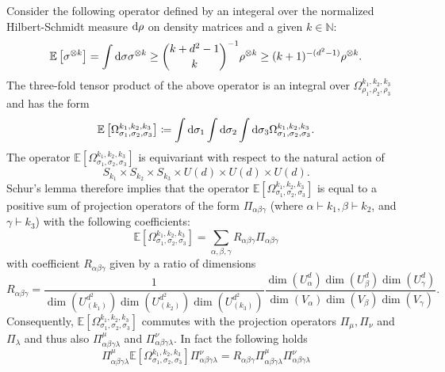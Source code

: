 \documentclass[notitlepage]{article}
\begin{document}
Consider the following operator defined by an integeral over the normalized Hilbert-Schmidt measure $\mathrm{d} \rho$ on density matrices and a given $k \in \mathbb N$:
\begin{equation}
    \mathbb E\left[ \sigma^{\otimes k} \right] = \int \mathrm{d} \sigma \sigma^{\otimes k} \geq \binom{k+d^2-1}{k}^{-1} \rho^{\otimes k} \geq (k+1)^{-(d^2-1)} \rho^{\otimes k}.
\end{equation}
The three-fold tensor product of the above operator is an integral over $\Omega_{\rho_1,\rho_2,\rho_3}^{k_1, k_2, k_3}$ and has the form
\begin{equation}
    \mathbb E\left[\Omega_{\sigma_1,\sigma_2,\sigma_3}^{k_1, k_2, k_3}\right] \coloneqq \int \mathrm{d} \sigma_1 \int \mathrm{d} \sigma_2 \int \mathrm{d} \sigma_3 \Omega_{\sigma_1,\sigma_2,\sigma_3}^{k_1, k_2, k_3}.
\end{equation}
The operator $\mathbb E\left[\Omega_{\sigma_1,\sigma_2,\sigma_3}^{k_1, k_2, k_3}\right]$ is equivariant with respect to the natural action of 
\begin{equation}
    S_{k_1} \times S_{k_2} \times S_{k_3} \times U(d) \times U(d) \times U(d).
\end{equation}
Schur's lemma therefore implies that the operator $\mathbb E\left[\Omega_{\sigma_1,\sigma_2,\sigma_3}^{k_1, k_2, k_3}\right]$ is equal to a positive sum of projection operators of the form $\Pi_{\alpha\beta\gamma}$ (where $\alpha \vdash k_1, \beta \vdash k_2$, and $\gamma \vdash k_3$) with the following coefficients:
\begin{equation}
    \label{eq:mean_tensor_power_decomp}
    \mathbb E\left[\Omega_{\sigma_1,\sigma_2,\sigma_3}^{k_1, k_2, k_3}\right] = \sum_{\alpha,\beta,\gamma} R_{\alpha\beta \gamma}\Pi_{\alpha\beta\gamma}
\end{equation}
with coefficient $R_{\alpha \beta \gamma}$ given by a ratio of dimensions
\begin{equation}
    R_{\alpha \beta \gamma} 
    =
    \frac{1}{\dim(U^{d^2}_{(k_1)})\dim(U^{d^2}_{(k_2)})\dim(U^{d^2}_{(k_3)})} 
    \frac{\dim(U^d_\alpha)\dim(U^d_{\beta})\dim(U^d_{\gamma})}{\dim(V_\alpha)\dim(V_{\beta})\dim(V_{\gamma})}.
\end{equation}
Consequently, $\mathbb E\left[\Omega_{\sigma_1,\sigma_2,\sigma_3}^{k_1, k_2, k_3}\right]$ commutes with the projection operators $\Pi_{\mu}, \Pi_{\nu}$ and $\Pi_{\lambda}$ and thus also $\Pi_{\alpha\beta\gamma\lambda}^{\mu}$ and $\Pi_{\alpha\beta\gamma\lambda}^{\nu}$.
In fact the following holds
\begin{equation}
    \Pi_{\alpha\beta\gamma\lambda}^{\mu}\mathbb E\left[\Omega_{\sigma_1,\sigma_2,\sigma_3}^{k_1, k_2, k_3}\right]\Pi_{\alpha\beta\gamma\lambda}^{\nu} = R_{\alpha\beta\gamma} \Pi_{\alpha\beta\gamma\lambda}^{\mu}\Pi_{\alpha\beta\gamma\lambda}^{\nu}
\end{equation}
\end{document}
